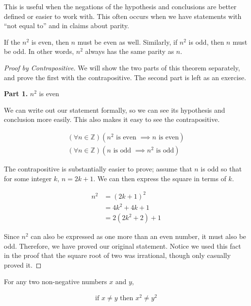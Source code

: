 \documentclass[twoside]{report}
\newcommand{\header}[2]{\begin{flushright} \textbf{#1} #2 \end{flushright}}
\begin{document}
This is useful when the negations of the hypothesis and conclusions are better defined or easier to work with. This often occurs when we have statements with ``not equal to'' and in claims about parity.

\vspace{\baselineskip}
\begin{theorem}
	If the $n^2$ is even, then $n$ must be even as well. Similarly, if $n^2$ is odd, then $n$ must be odd. In other words, $n^2$ always has the same parity as $n$.
\end{theorem}

\begin{proof}[Proof by Contrapositive]
	We will show the two parts of this theorem separately, and prove the first with the contrapositive. The second part is left as an exercise.
	
	\header{Part 1.}{$n^2$ is even}
	We can write out our statement formally, so we can see its hypothesis and conclusion more easily. This also makes it easy to see the contrapositive.
	
	\begin{align*} 
		(\forall n \in \mathbb{Z})(n^2 \text{ is even } \implies n \text{ is even}) \\
		(\forall n \in \mathbb{Z})(n \text{ is odd } \implies n^2 \text{ is odd})
	\end{align*}
	
	The contrapositive is substantially easier to prove; assume that $n$ is odd so that for some integer $k$, $n = 2k + 1$. We can then express the square in terms of $k$.
	
	\begin{align*}
		n^2 &= (2k + 1)^2 \\
		&= 4k^2 + 4k + 1 \\
		&= 2(2k^2 + 2) + 1
	\end{align*}
	
	Since $n^2$ can also be expressed as one more than an even number, it must also be odd. Therefore, we have proved our original statement. Notice we used this fact in the proof that the square root of two was irrational, though only casually proved it.
\end{proof}

\vspace{\baselineskip}
\begin{theorem}
	For any two non-negative numbers $x$ and $y$,
	
	\begin{align*}
		\text{if } x \neq y \text{ then } x^2 \neq y^2
	\end{align*}
\end{theorem}
\end{document}
